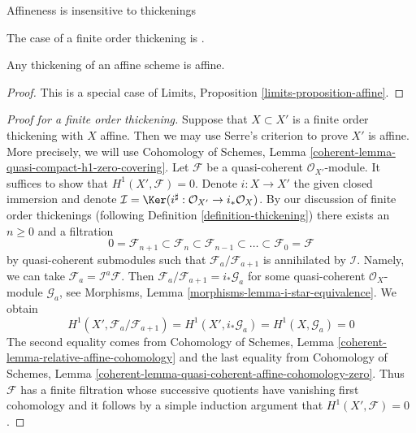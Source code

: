 \begin{lemma}
\label{lemma-thickening-affine-scheme}
\begin{slogan}
Affineness is insensitive to thickenings
\end{slogan}
\begin{reference}
The case of a finite order thickening is \cite[Proposition 5.1.9]{EGA1}.
\end{reference}
Any thickening of an affine scheme is affine.
\end{lemma}

\begin{proof}
This is a special case of
Limits, Proposition \ref{limits-proposition-affine}.
\end{proof}

\begin{proof}[Proof for a finite order thickening]
Suppose that $X \subset X'$ is a finite order thickening with $X$ affine. Then
we may use Serre's criterion to prove $X'$ is affine. More precisely, we will
use Cohomology of Schemes, Lemma
\ref{coherent-lemma-quasi-compact-h1-zero-covering}. Let $\mathcal{F}$ be a
quasi-coherent $\mathcal{O}_{X'}$-module. It suffices to show that
$H^1(X', \mathcal{F}) = 0$. Denote $i : X \to X'$ the given closed immersion
and denote
$\mathcal{I} = \Ker(i^\sharp : \mathcal{O}_{X'} \to i_*\mathcal{O}_X)$.
By our discussion of finite order thickenings (following
Definition \ref{definition-thickening}) there exists an $n \geq 0$
and a filtration
$$
0 = \mathcal{F}_{n + 1} \subset \mathcal{F}_n \subset
\mathcal{F}_{n - 1} \subset \ldots \subset
\mathcal{F}_0 = \mathcal{F}
$$
by quasi-coherent submodules such that $\mathcal{F}_a/\mathcal{F}_{a + 1}$ is
annihilated by $\mathcal{I}$. Namely, we can take
$\mathcal{F}_a = \mathcal{I}^a\mathcal{F}$. Then
$\mathcal{F}_a/\mathcal{F}_{a + 1} = i_*\mathcal{G}_a$ for some quasi-coherent
$\mathcal{O}_X$-module $\mathcal{G}_a$, see Morphisms, Lemma
\ref{morphisms-lemma-i-star-equivalence}. We obtain
$$
H^1(X', \mathcal{F}_a/\mathcal{F}_{a + 1}) =
H^1(X', i_*\mathcal{G}_a) = H^1(X, \mathcal{G}_a) = 0
$$
The second equality comes from Cohomology of Schemes, Lemma
\ref{coherent-lemma-relative-affine-cohomology}
and the last equality from Cohomology of Schemes, Lemma
\ref{coherent-lemma-quasi-coherent-affine-cohomology-zero}.
Thus $\mathcal{F}$ has a finite filtration whose successive quotients
have vanishing first cohomology and it follows by a simple
induction argument that $H^1(X', \mathcal{F}) = 0$.
\end{proof}

